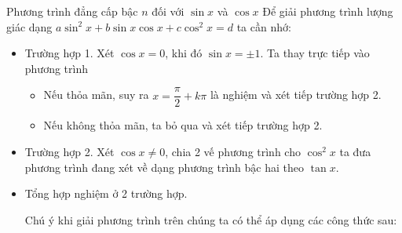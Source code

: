 
\begin{dang}{Phương trình đẳng cấp bậc $n$ đối với $\sin x$ và $\cos x$ }
		Để giải phương trình lượng giác dạng $a\sin^2x+b\sin x\cos x+c\cos^2x=d$ ta cần nhớ:
		\begin{itemize}
		\item Trường hợp 1. Xét $\cos x =0$, khi đó $\sin x = \pm 1$. Ta thay trực tiếp vào phương trình
		\begin{itemize}
		\item Nếu thỏa mãn, suy ra $x=\dfrac{\pi}{2}+k \pi$ là nghiệm và xét tiếp trường hợp 2.
		\item Nếu không thỏa mãn, ta bỏ qua và xét tiếp trường hợp 2.
		\end{itemize}
		\item  Trường hợp 2. Xét $\cos x \ne 0$, chia 2 vế phương trình cho $\cos^2 x$ ta đưa phương trình đang xét về dạng phương trình bậc hai theo $\tan x$.
		\item  Tổng hợp nghiệm ở 2 trường hợp.
	
		\begin{note}
			Chú ý khi giải phương trình trên chúng ta có thể áp dụng các công thức sau:
		\end{note}
			\end{itemize}
\end{dang}
